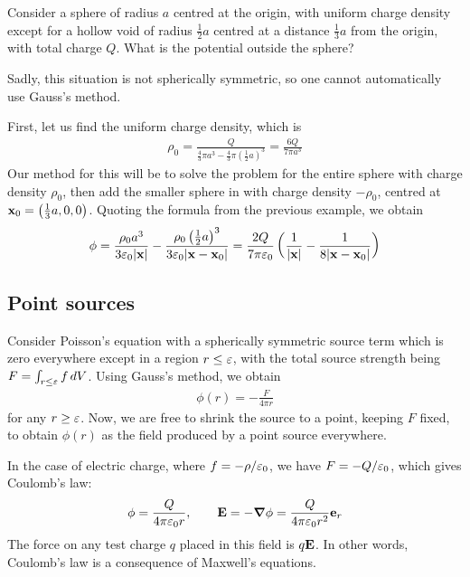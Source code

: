 \documentclass{../template/note}
\begin{document}
    \begin{example*}
        Consider a sphere of radius \(a\) centred at the origin, with uniform charge density except for a hollow void of radius \(\frac 1 2 a\) centred at a distance \(\frac 1 3 a\) from the origin, with total charge \(Q\). What is the potential outside the sphere?

        Sadly, this situation is not spherically symmetric, so one cannot automatically use Gauss's method.

        First, let us find the uniform charge density, which is
        \begin{align*}
            \rho_0 = \frac{Q}{\frac 4 3 \pi a^3 - \frac 4 3\pi\left(\frac 1 2a\right)^3} = \frac{6Q}{7\pi a^3}
        \end{align*}
        Our method for this will be to solve the problem for the entire sphere with charge density \(\rho_0\), then add the smaller sphere in with charge density \(-\rho_0\), centred at \(\V x_0 = \left(\frac 1 3 a, 0, 0\right)\). Quoting the formula from the previous example, we obtain
        \begin{align*}
            \phi = \frac{\rho_0a^3}{3\eps_0|\V x|} - \frac{\rho_0\left(\frac 1 2 a\right)^3}{3\eps_0|\V x - \V x_0|} = \frac{2Q}{7\pi\eps_0}\left(\frac 1{|\V x|} - \frac 1{8|\V x - \V x_0|}\right)
        \end{align*}
    \end{example*}
    
    \subsection{Point sources}
    
    Consider Poisson's equation with a spherically symmetric source term which is zero everywhere except in a region \(r \leq \varepsilon\), with the total source strength being \(F = \int_{r \leq \varepsilon} f \,d{V}\). Using Gauss's method, we obtain
    \begin{align*}
        \phi(r) = -\frac{F}{4\pi r}
    \end{align*}
    for any \(r \geq \varepsilon\). Now, we are free to shrink the source to a point, keeping \(F\) fixed, to obtain \(\phi(r)\) as the field produced by a point source everywhere.
    

    In the case of electric charge, where \(f = -\rho/\varepsilon_0\), we have \(F = -Q/\varepsilon_0\), which gives Coulomb's law:
    \begin{align*}
        \phi = \frac{Q}{4\pi \eps_0 r}, \qquad \V E = -\grad \phi = \frac{Q}{4\pi \eps_0 r^2} \V e_r
    \end{align*}
    The force on any test charge \(q\) placed in this field is \(q\V E\). In other words, Coulomb's law is a consequence of Maxwell's equations.
\end{document}
